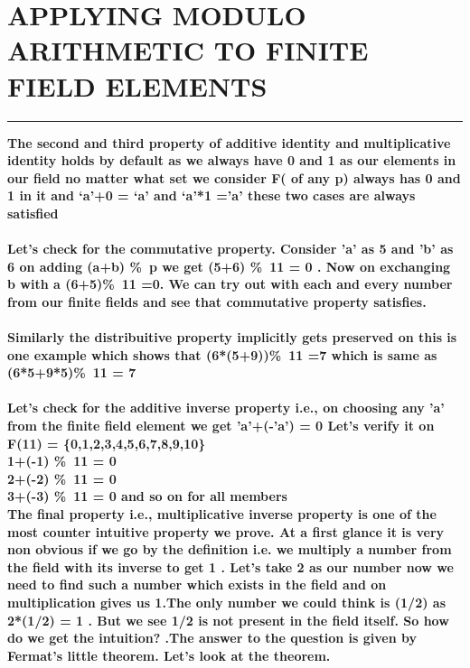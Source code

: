 \documentclass{article}
\begin{document}
\section * {APPLYING MODULO ARITHMETIC TO FINITE FIELD ELEMENTS }
\hrule 
\bigskip 
\textbf{The second and third property of  additive identity and multiplicative identity holds by default as we always have 0 and 1 as our elements in our field no matter what set we consider F( of any p) always has 0 and 1 in it  and ‘a’+0 = ‘a’ and ‘a’*1 =’a’ these two cases are always satisfied}
\\
\\
\textbf{Let's check for the commutative property. Consider 'a' as 5 and 'b' as 6 on adding (a+b) \%\ p we get (5+6) \%\ 11 = 0 . Now on exchanging b with a (6+5)\%\ 11 =0. We can try out with each and every number from our finite fields and see that commutative property satisfies.
}
\\
\\
\textbf{Similarly the distribuitive property implicitly gets  preserved on this is one example which shows that (6*(5+9))\%\ 11 =7  which is same as (6*5+9*5)\%\ 11 = 7}
\\
\\
\textbf{ Let's check for the additive inverse property i.e., on choosing any 'a' from the finite field element we get 'a'+(-'a') = 0 
Let's verify it on F(11) = \{0,1,2,3,4,5,6,7,8,9,10\} 
\\
1+(-1) \%\ 11 = 0 \\
2+(-2) \%\ 11 = 0 \\
3+(-3) \%\ 11 = 0 and so on for all members }
\\
\textbf{The final property i.e., multiplicative inverse property is one of the most counter intuitive property we prove. At a first glance it is very non obvious if we go by the definition i.e. we multiply a number from the field with its inverse to get 1 . Let's take 2 as our number now we need to find such a number which exists in the field and on multiplication gives us 1.The only number we could think is (1/2) as 2*(1/2) = 1 . But we see 1/2 is not present in the field itself. So how do we get the intuition? .The answer to the question is given by Fermat's little theorem. Let's look at the theorem.}
\pagebreak 
\end{document}
